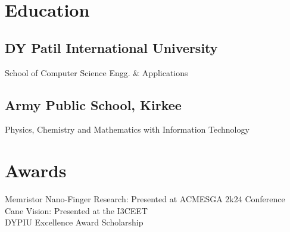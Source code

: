 \documentclass[]{plushcv}
\begin{document}
\begin{minipage}[t]{0.28\textwidth}

\section{Education}

\subsection{DY Patil International University}
School of Computer Science Engg. \& Applications \\

\subsection{Army Public School, Kirkee}
Physics, Chemistry and Mathematics with Information Technology \\

\sectionsep

\section{Awards}
\textbullet{}Memristor Nano-Finger Research: Presented at ACMESGA 2k24 Conference\\
\textbullet{}Cane Vision: Presented at the I3CEET\\
\textbullet{}DYPIU Excellence Award Scholarship \\

\end{minipage} 
\end{document}

